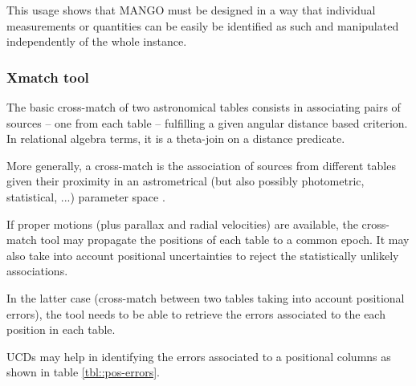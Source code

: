 \documentclass[11pt,a4paper]{ivoa}
\begin{document}
This usage shows that MANGO must be designed in a way that individual measurements or quantities can be easily be identified as such and manipulated independently of the whole instance.


\subsubsection{Xmatch tool }

The basic cross-match of two astronomical tables consists in associating pairs of sources -- one from each table -- fulfilling a given angular distance based criterion.
In relational algebra terms, it is a theta-join on a distance predicate.

More generally, a cross-match is the association of sources from different tables given their proximity in an astrometrical (but also possibly photometric, statistical, ...) parameter space \citep{2017A&A...597A..89P} .

If proper motions (plus parallax and radial velocities) are available, the cross-match tool may propagate the positions of each table to a common epoch.
It may also take into account positional uncertainties to reject the statistically unlikely associations.

In the latter case (cross-match between two tables taking into account positional errors), the tool needs to be able to retrieve the errors associated to the each position in each table.

UCDs may help in identifying the errors associated to a positional columns as shown in table \ref{tbl::pos-errors}.
\end{document}
